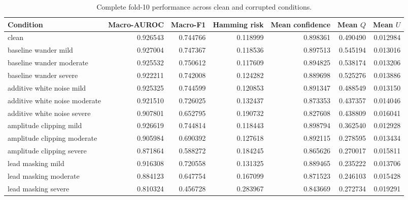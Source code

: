 \begin{table}[h]
\centering
\scriptsize
\caption{Complete fold-10 performance across clean and corrupted conditions.}
\label{tab:condition_metrics}
\begin{tabular}{lrrrrrr}
\toprule
Condition & Macro-AUROC & Macro-F1 & Hamming risk & Mean confidence & Mean $Q$ & Mean $U$ \\
\midrule
clean & 0.926543 & 0.744766 & 0.118999 & 0.898361 & 0.490490 & 0.012984 \\
baseline wander mild & 0.927004 & 0.747367 & 0.118536 & 0.897513 & 0.545194 & 0.013016 \\
baseline wander moderate & 0.925532 & 0.750612 & 0.117609 & 0.894825 & 0.538174 & 0.013206 \\
baseline wander severe & 0.922211 & 0.742008 & 0.124282 & 0.889698 & 0.525276 & 0.013886 \\
additive white noise mild & 0.925325 & 0.744599 & 0.120853 & 0.891347 & 0.488549 & 0.013150 \\
additive white noise moderate & 0.921510 & 0.726025 & 0.132437 & 0.873353 & 0.437357 & 0.014046 \\
additive white noise severe & 0.907801 & 0.652795 & 0.190732 & 0.827608 & 0.438809 & 0.016041 \\
amplitude clipping mild & 0.926619 & 0.744814 & 0.118443 & 0.898794 & 0.362540 & 0.012928 \\
amplitude clipping moderate & 0.905984 & 0.690392 & 0.127618 & 0.892115 & 0.278595 & 0.013434 \\
amplitude clipping severe & 0.871864 & 0.588272 & 0.184245 & 0.865626 & 0.270017 & 0.015811 \\
lead masking mild & 0.916308 & 0.720558 & 0.131325 & 0.889465 & 0.235222 & 0.013706 \\
lead masking moderate & 0.884123 & 0.647754 & 0.167099 & 0.871523 & 0.246103 & 0.015428 \\
lead masking severe & 0.810324 & 0.456728 & 0.283967 & 0.843669 & 0.272734 & 0.019291 \\
\bottomrule
\end{tabular}
\end{table}
